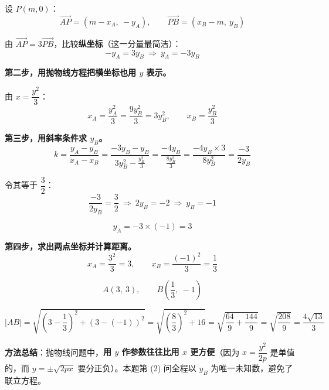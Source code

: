 \begin{answer}
设 $P(m,0)$：
\nopagebreak[4]
\[\overrightarrow{AP}=\left(m-x_A,\ -y_A\right),\qquad \overrightarrow{PB}=\left(x_B-m,\ y_B\right)\]

由 $\overrightarrow{AP}=3\overrightarrow{PB}$，比较\textbf{纵坐标}（这一分量最简洁）：
\nopagebreak[4]
\[-y_A=3y_B\ \Longrightarrow\ y_A=-3y_B\]

\textbf{第二步，用抛物线方程把横坐标也用 $y$ 表示。}

由 $x=\dfrac{y^{2}}3$：
\nopagebreak[4]
\[x_A=\frac{y_A^{2}}3=\frac{9y_B^{2}}3=3y_B^{2},\qquad x_B=\frac{y_B^{2}}3\]

\textbf{第三步，用斜率条件求 $y_B$。}
\nopagebreak[4]
\[k=\frac{y_A-y_B}{x_A-x_B}=\frac{-3y_B-y_B}{3y_B^{2}-\frac{y_B^{2}}3}=\frac{-4y_B}{\frac{8y_B^{2}}3}=\frac{-4y_B\times3}{8y_B^{2}}=\frac{-3}{2y_B}\]

令其等于 $\dfrac32$：
\nopagebreak[4]
\[\frac{-3}{2y_B}=\frac32\ \Longrightarrow\ 2y_B=-2\ \Longrightarrow\ y_B=-1\]

\nopagebreak[4]
\[y_A=-3\times(-1)=3\]

\textbf{第四步，求出两点坐标并计算距离。}
\nopagebreak[4]
\[x_A=\frac{3^{2}}3=3,\qquad x_B=\frac{(-1)^{2}}3=\frac13\]

\nopagebreak[4]
\[A(3,\ 3),\qquad B\left(\frac13,\ -1\right)\]

\nopagebreak[4]
\[|AB|=\sqrt{\left(3-\frac13\right)^{2}+\left(3-(-1)\right)^{2}}=\sqrt{\left(\frac83\right)^{2}+16}=\sqrt{\frac{64}9+\frac{144}9}=\sqrt{\frac{208}9}=\frac{4\sqrt{13}}3\]

\begin{gktip}
\textbf{方法总结}：抛物线问题中，\textbf{用 $y$ 作参数往往比用 $x$ 更方便}（因为 $x=\dfrac{y^{2}}{2p}$ 是单值的，而 $y=\pm\sqrt{2px}$ 要分正负）。本题第 (2) 问全程以 $y_B$ 为唯一未知数，避免了联立方程。
\end{gktip}



\par\medskip

\end{answer}
